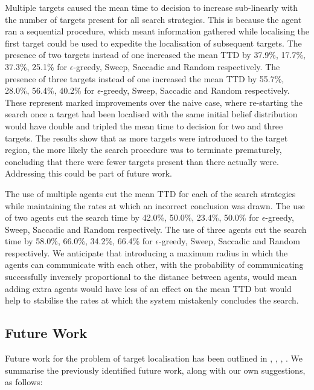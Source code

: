 Multiple targets caused the mean time to decision to increase sub-linearly with the number of targets present for all search strategies. This is because the agent ran a sequential procedure, which meant information gathered while localising the first target could be used to expedite the localisation of subsequent targets. The presence of two targets instead of one increased the mean TTD by 37.9\%, 17.7\%, 37.3\%, 25.1\% for $\epsilon$-greedy, Sweep, Saccadic and Random respectively. The presence of three targets instead of one increased the mean TTD by 55.7\%,  28.0\%, 56.4\%, 40.2\% for $\epsilon$-greedy, Sweep, Saccadic and Random respectively. These represent marked improvements over the naive case, where re-starting the search once a target had been localised with the same initial belief distribution would have double and tripled the mean time to decision for two and three targets. The results show that as more targets were introduced to the target region, the more likely the search procedure was to terminate prematurely, concluding that there were fewer targets present than there actually were. Addressing this could be part of future work.\par

The use of multiple agents cut the mean TTD for each of the search strategies while maintaining the rates at which an incorrect conclusion was drawn. The use of two agents cut the search time by 42.0\%, 50.0\%, 23.4\%, 50.0\% for $\epsilon$-greedy, Sweep, Saccadic and Random respectively. The use of three agents cut the search time by 58.0\%, 66.0\%, 34.2\%, 66.4\% for $\epsilon$-greedy, Sweep, Saccadic and Random respectively. We anticipate that introducing a maximum radius in which the agents can communicate with each other, with the probability of communicating successfully inversely proportional to the distance between agents, would mean adding extra agents would have less of an effect on the mean TTD but would help to stabilise the rates at which the system mistakenly concludes the search.

\subsection{Future Work}
Future work for the problem of target localisation has been outlined in \cite{Chung2007ASearch}, \cite{Chung2008Multi-agentFramework}, \cite{Chung2012AnalysisStrategies}, \cite{Kriheli2016OptimalInspections}. We summarise the previously identified future work, along with our own suggestions, as follows:

